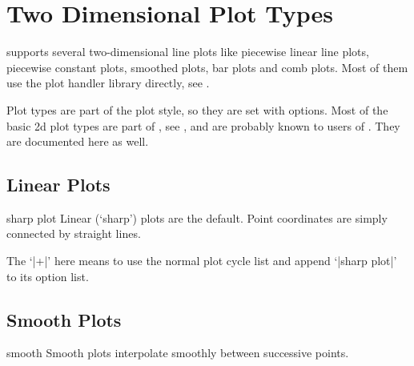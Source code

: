 
\section{Two Dimensional Plot Types}

{%

\PGFPlots{} supports several two-dimensional line plots like piecewise linear
line plots, piecewise constant plots, smoothed plots, bar plots and comb plots.
Most of them use the \PGF{} plot handler library directly, see
\cite[Section~18.8]{tikz}.

Plot types are part of the plot style, so they are set with options. Most of
the basic 2d plot types are part of \Tikz{}, see \cite[Section~18.8]{tikz}, and
are probably known to users of \Tikz{}. They are documented here as well.


\subsection{Linear Plots}

\begin{plottype}{sharp plot}
    Linear (`sharp') plots are the default. Point coordinates are simply
    connected by straight lines.
\begin{codeexample}[]
\end{codeexample}

    The `|+|' here means to use the normal plot cycle list and append
    `|sharp plot|' to its option list.
\end{plottype}


\subsection{Smooth Plots}

\begin{plottype}{smooth}
    Smooth plots interpolate smoothly between successive points.
\begin{codeexample}[]
\end{codeexample}
\end{plottype}

}
